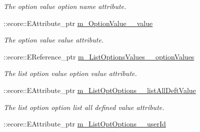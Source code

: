 \begin{DoxyCompactItemize}
\begin{DoxyCompactList}\small\item\em The option value option name attribute. \item\end{DoxyCompactList}\item 
\hypertarget{classUMS__Data_1_1UMS__DataPackage_adf371e12d98bc5bd707cf7c759a95f87}{
::ecore::EAttribute\_\-ptr \hyperlink{classUMS__Data_1_1UMS__DataPackage_adf371e12d98bc5bd707cf7c759a95f87}{m\_\-OptionValue\_\-\_\-value}}
\label{classUMS__Data_1_1UMS__DataPackage_adf371e12d98bc5bd707cf7c759a95f87}

\begin{DoxyCompactList}\small\item\em The option value value attribute. \item\end{DoxyCompactList}\item 
\hypertarget{classUMS__Data_1_1UMS__DataPackage_adf21d8c0c0bd93b233f2594de61f068c}{
::ecore::EReference\_\-ptr \hyperlink{classUMS__Data_1_1UMS__DataPackage_adf21d8c0c0bd93b233f2594de61f068c}{m\_\-ListOptionsValues\_\-\_\-optionValues}}
\label{classUMS__Data_1_1UMS__DataPackage_adf21d8c0c0bd93b233f2594de61f068c}

\begin{DoxyCompactList}\small\item\em The list option value option value attribute. \item\end{DoxyCompactList}\item 
\hypertarget{classUMS__Data_1_1UMS__DataPackage_ae56e34f1e364e7c677b361d725973922}{
::ecore::EAttribute\_\-ptr \hyperlink{classUMS__Data_1_1UMS__DataPackage_ae56e34f1e364e7c677b361d725973922}{m\_\-ListOptOptions\_\-\_\-listAllDeftValue}}
\label{classUMS__Data_1_1UMS__DataPackage_ae56e34f1e364e7c677b361d725973922}

\begin{DoxyCompactList}\small\item\em The list option option list all defined value attribute. \item\end{DoxyCompactList}\item 
\hypertarget{classUMS__Data_1_1UMS__DataPackage_a53609806861daaa12fe55a0678646621}{
::ecore::EAttribute\_\-ptr \hyperlink{classUMS__Data_1_1UMS__DataPackage_a53609806861daaa12fe55a0678646621}{m\_\-ListOptOptions\_\-\_\-userId}}
\label{classUMS__Data_1_1UMS__DataPackage_a53609806861daaa12fe55a0678646621}


\end{DoxyCompactItemize}
